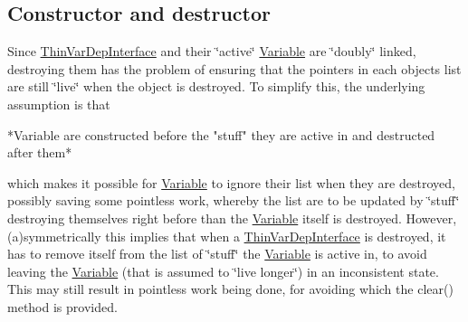 \subsection*{Constructor and destructor}
\label{_amgrpe7842d077f4197a0a949b269f1500ffe}%
Since \mbox{\hyperlink{class_s_m_spp__di__unipi__it_1_1_thin_var_dep_interface}{Thin\+Var\+Dep\+Interface}} and their \char`\"{}active\char`\"{} \mbox{\hyperlink{class_s_m_spp__di__unipi__it_1_1_variable}{Variable}} are \char`\"{}doubly\char`\"{} linked, destroying them has the problem of ensuring that the pointers in each object\textquotesingle{}s list are still \char`\"{}live\char`\"{} when the object is destroyed. To simplify this, the underlying assumption is that \begin{DoxyVerb}*Variable are constructed before the "stuff" they are active
 in and destructed after them*
\end{DoxyVerb}


which makes it possible for \mbox{\hyperlink{class_s_m_spp__di__unipi__it_1_1_variable}{Variable}} to ignore their list when they are destroyed, possibly saving some pointless work, whereby the list are to be updated by \char`\"{}stuff\char`\"{} destroying themselves right before than the \mbox{\hyperlink{class_s_m_spp__di__unipi__it_1_1_variable}{Variable}} itself is destroyed. However, (a)symmetrically this implies that when a \mbox{\hyperlink{class_s_m_spp__di__unipi__it_1_1_thin_var_dep_interface}{Thin\+Var\+Dep\+Interface}} is destroyed, it has to remove itself from the list of \char`\"{}stuff\char`\"{} the \mbox{\hyperlink{class_s_m_spp__di__unipi__it_1_1_variable}{Variable}} is active in, to avoid leaving the \mbox{\hyperlink{class_s_m_spp__di__unipi__it_1_1_variable}{Variable}} (that is assumed to \char`\"{}live longer\char`\"{}) in an inconsistent state. This may still result in pointless work being done, for avoiding which the clear() method is provided.


